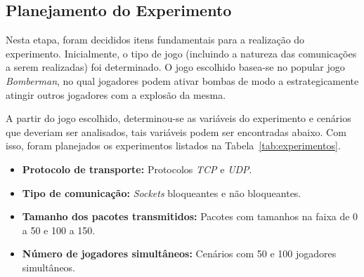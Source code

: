 \documentclass[12pt]{article}
\begin{document}
\subsection{Planejamento do Experimento} \label{sub:planejamento}

Nesta etapa, foram decididos itens fundamentais para a realização do
experimento. Inicialmente, o tipo de jogo (incluindo a natureza das
comunicações a serem realizadas) foi determinado. O jogo escolhido basea-se no
popular jogo \emph{Bomberman}, no qual jogadores podem ativar bombas de modo a
estrategicamente atingir outros jogadores com a explosão da mesma.

A partir do jogo escolhido, determinou-se as variáveis do experimento e
cenários que deveriam ser analisados, tais variáveis podem ser encontradas
abaixo. Com isso, foram planejados os experimentos listados na Tabela~\ref{tab:experimentos}.

\begin{itemize}
  \item \textbf{Protocolo de transporte:} Protocolos \emph{TCP} e \emph{UDP}.
  \item \textbf{Tipo de comunicação:} \emph{Sockets} bloqueantes e não bloqueantes.
  \item \textbf{Tamanho dos pacotes transmitidos:} Pacotes com tamanhos na faixa de 0 a 50 e 100 a 150.
  \item \textbf{Número de jogadores simultâneos:} Cenários com 50 e 100 jogadores simultâneos.
\end{itemize}
\end{document}
